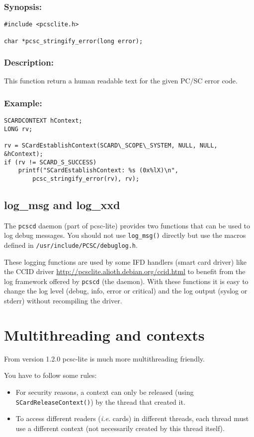 \documentclass[a4paper,12pt]{article}
\newcommand{\synopsis}{\subsubsection{Synopsis:}}
\newcommand{\desc}{\subsubsection{Description:}}
\newcommand{\example}{\subsubsection{Example:}}
\begin{document}
\synopsis

\begin{verbatim}
#include <pcsclite.h>

char *pcsc_stringify_error(long error);
\end{verbatim}

\desc

This function return a human readable text for the given PC/SC error
code.

\example


\begin{verbatim}
SCARDCONTEXT hContext;
LONG rv;

rv = SCardEstablishContext(SCARD\_SCOPE\_SYSTEM, NULL, NULL, &hContext);
if (rv != SCARD_S_SUCCESS)
    printf("SCardEstablishContext: %s (0x%lX)\n",
        pcsc_stringify_error(rv), rv);
\end{verbatim}


\subsection{log\_msg and log\_xxd}

The \texttt{pcscd} daemon (part of pcsc-lite) provides two functions
that can be used to log debug messages. You should not use
\texttt{log\_msg()} directly but use the macros defined in
\texttt{/usr/include/PCSC/debuglog.h}.

These logging functions are used by some IFD handlers (smart card
driver) like the CCID driver
\url{http://pcsclite.alioth.debian.org/ccid.html} to benefit from the
log framework offered by \texttt{pcscd} (the daemon). With these
functions it is easy to change the log level (debug, info, error or
critical) and the log output (syslog or stderr) without recompiling the
driver.


\section{Multithreading and contexts}

From version 1.2.0 pcsc-lite is much more multithreading friendly.

You have to follow some rules:

\begin{itemize}
\item For security reasons, a context can only be released (using
\texttt{SCardReleaseContext()}) by the thread that created it.

\item To access different readers (\emph{i.e.} cards) in different
threads, each thread must use a different context (not necessarily
created by this thread itself).

\end{itemize}
\end{document}
